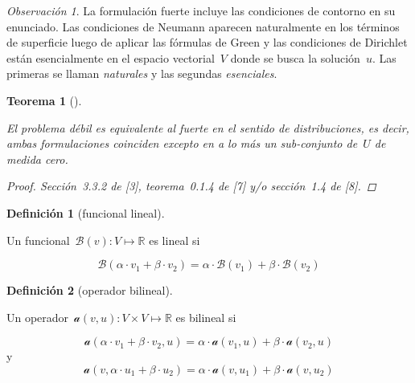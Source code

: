 \documentclass[
  12pt,
  a4paper,
  table]{scrbook}
\theoremstyle{plain}
\theoremstyle{definition}
\newtheorem{definition}{Definición}[chapter]
\theoremstyle{plain}
\newtheorem{theorem}{Teorema}[chapter]
\theoremstyle{plain}
\theoremstyle{remark}
\newtheorem*{remark}{Observación}
\begin{document}
\begin{remark}

La formulación fuerte incluye las condiciones de contorno en su
enunciado. Las condiciones de Neumann aparecen naturalmente en los
términos de superficie luego de aplicar las fórmulas de Green y las
condiciones de Dirichlet están esencialmente en el espacio
vectorial~\(V\) donde se busca la solución~\(u\). Las primeras se llaman
\emph{naturales} y las segundas \emph{esenciales}.

\end{remark}

\begin{theorem}[]\protect\hypertarget{thm-equivalencia-fuerte-debil}{}\label{thm-equivalencia-fuerte-debil}

El problema débil es equivalente al fuerte en el sentido de
distribuciones, es decir, ambas formulaciones coinciden excepto en a lo
más un sub-conjunto de~\(U\) de medida cero.

\begin{proof}

Sección~3.3.2 de {[}3{]}, teorema~0.1.4 de {[}7{]} y/o sección~1.4 de
{[}8{]}.

\end{proof}

\end{theorem}

\begin{definition}[funcional
lineal]\protect\hypertarget{def-H-lineal}{}\label{def-H-lineal}

Un funcional~\(\mathcal{B}(v) : V \mapsto \mathbb{R}\) es lineal si

\[
\mathcal{B}(\alpha \cdot v_1 + \beta \cdot v_2) = \alpha \cdot  \mathcal{B}(v_1) + \beta \cdot \mathcal{B}(v_2)
\]

\end{definition}

\begin{definition}[operador
bilineal]\protect\hypertarget{def-a-bilineal}{}\label{def-a-bilineal}

Un operador~\(\mathcal{a}(v,u) : V \times V \mapsto \mathbb{R}\) es
bilineal si

\[
\mathcal{a}(\alpha \cdot v_1 + \beta \cdot v_2, u) = \alpha \cdot \mathcal{a}(v_1,u) + \beta \cdot \mathcal{a}(v_2,u)
\] y \[
\mathcal{a}(v, \alpha \cdot u_1 + \beta \cdot u_2) = \alpha \cdot \mathcal{a}(v,u_1) + \beta \cdot \mathcal{a}(v,u_2)
\]

\end{definition}
\end{document}
